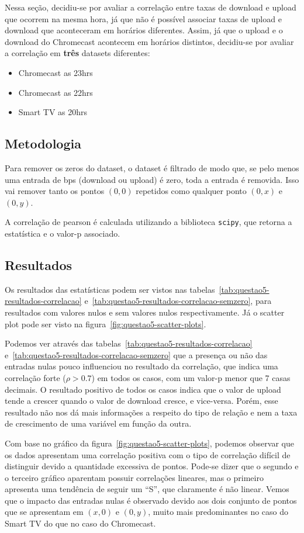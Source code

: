 \documentclass{article}
\begin{document}
Nessa seção, decidiu-se por avaliar a correlação entre taxas de download e upload que ocorrem na mesma hora, já que não é possível associar taxas de upload e download que aconteceram em horários diferentes. Assim, já que o upload e o download do Chromecast acontecem em horários distintos, decidiu-se por avaliar a correlação em \textbf{três} datasets diferentes:
\begin{itemize}
	\item Chromecast as 23hrs
	\item Chromecast as 22hrs
	\item Smart TV as 20hrs
\end{itemize}

\subsection{Metodologia}

Para remover os zeros do dataset, o dataset é filtrado de modo que, se pelo menos uma entrada de bps (download ou upload) é zero, toda a entrada é removida. Isso vai remover tanto os pontos $(0,0)$ repetidos como qualquer ponto $(0,x)$ e $(0,y)$.

A correlação de pearson é calculada utilizando a biblioteca \texttt{scipy}, que retorna a estatística e o valor-p associado.

\subsection{Resultados}

Os resultados das estatísticas podem ser vistos nas tabelas~\ref{tab:questao5-resultados-correlacao} e~\ref{tab:questao5-resultados-correlacao-semzero}, para resultados com valores nulos e sem valores nulos respectivamente. Já o scatter plot pode ser visto na figura~\ref{fig:questao5-scatter-plots}.

Podemos ver através das tabelas~\ref{tab:questao5-resultados-correlacao} e~\ref{tab:questao5-resultados-correlacao-semzero} que a presença ou não das entradas nulas pouco influenciou no resultado da correlação, que indica uma correlação forte ($\rho>0.7$) em todos os casos, com um valor-p menor que 7 casas decimais. O resultado positivo de todos os casos indica que o valor de upload tende a crescer quando o valor de download cresce, e vice-versa. Porém, esse resultado não nos dá mais informações a respeito do tipo de relação e nem a taxa de crescimento de uma variável em função da outra.

Com base no gráfico da figura~\ref{fig:questao5-scatter-plots}, podemos observar que os dados apresentam uma correlação positiva com o tipo de correlação difícil de distinguir devido a quantidade excessiva de pontos. Pode-se dizer que o segundo e o terceiro gráfico aparentam possuir correlações lineares, mas o primeiro apresenta uma tendência de seguir um ``S'', que claramente é não linear. Vemos que o impacto das entradas nulas é observado devido aos dois conjunto de pontos que se apresentam em $(x,0)$ e $(0,y)$, muito mais predominantes no caso do Smart TV do que no caso do Chromecast.
\end{document}
